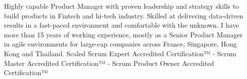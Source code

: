

\begin{cvparagraph}


Highly capable Product Manager with proven leadership and strategy skills to build products in Fintech and hi-tech industry. Skilled at delivering data-driven results in a fast-paced environment and comfortable with the unknown. I have more than 15 years of working experience, mostly as a Senior Product Manager in agile environments for large-cap companies across France, Singapore, Hong Kong and Thailand.
\newline
\newline
Scaled Scrum Expert Accredited Certification™  -  Scrum Master Accredited Certification™  -  Scrum Product Owner Accredited Certification™

\end{cvparagraph}
